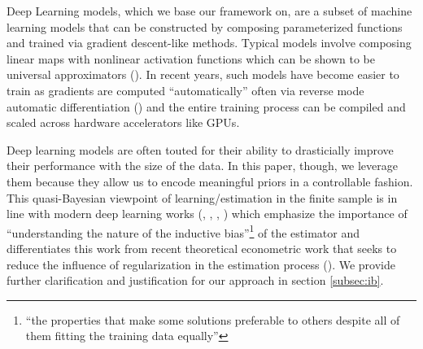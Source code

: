 \documentclass[a4paper,12pt]{article}
\begin{document}
Deep Learning models, which we base our framework on, are a subset of machine learning models that can be constructed by composing parameterized functions and trained via gradient descent-like methods. Typical models involve composing linear maps with nonlinear activation functions which can be shown to be universal approximators  (\cite{hornik1989multilayer}). In recent years, such models have become easier to train as gradients are computed ``automatically'' often via reverse mode automatic differentiation (\cite{griewank2008evaluating}) and the entire training process can be compiled and scaled across hardware accelerators like GPUs. \par 
Deep learning models are often touted for their ability to drasticially improve their performance with the size of the data. In this paper, though, we leverage them because they allow us to encode meaningful priors in a controllable fashion. This quasi-Bayesian viewpoint of learning/estimation in the finite sample is in line with modern deep learning works (\cite{belkin2018reconciling},  \cite{nagarajan2019uniform}, \cite{wilson2020case}, \cite{belkin2021fit}) which emphasize the importance of ``understanding the nature of the inductive bias''\footnote{\cite{belkin2021fit} ``the properties that make some solutions preferable to others despite all of them fitting the training data equally''} of the estimator and differentiates this work from recent theoretical econometric work that seeks to reduce the influence of regularization in the estimation process (\cite{chernozhukov2018double}). We provide further clarification and justification for our approach in section \ref{subsec:ib}.\par 
\end{document}
